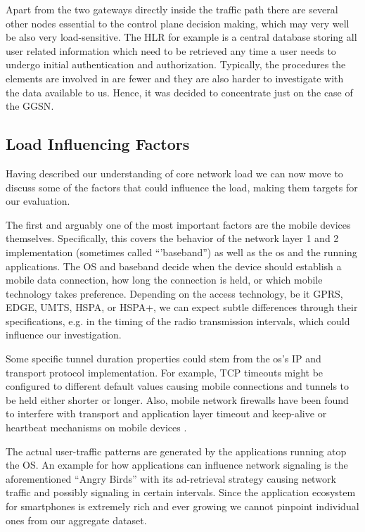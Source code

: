 Apart from the two gateways directly inside the traffic path there are several other nodes essential to the control plane decision making, which may very well be also very load-sensitive. The \gls{HLR} for example is a central database storing all user related information which need to be retrieved any time a user needs to undergo initial authentication and authorization. Typically, the procedures the elements are involved in are fewer and they are also harder to investigate with the data available to us. Hence, it was decided to concentrate just on the case of the \gls{GGSN}.


\subsection{Load Influencing Factors}

Having described our understanding of core network load we can now move to discuss some of the factors that could influence the load, making them targets for our evaluation.

The first and arguably one of the most important factors are the mobile devices themselves. Specifically, this covers the behavior of the network layer 1 and 2 implementation (sometimes called ``'baseband'') as well as the \gls{os} and the running applications. The OS and baseband decide when the device should establish a mobile data connection, how long the connection is held, or which mobile technology takes preference. Depending on the access technology, be it \acrshort{GPRS}, \acrshort{EDGE}, \acrshort{UMTS}, \acrshort{HSPA}, or \acrshort{HSPA+}, we can expect subtle differences through their specifications, e.g. in the timing of the radio transmission intervals, which could influence our investigation. 

Some specific tunnel duration properties could stem from the \gls{os}'s IP and transport protocol implementation. For example, TCP timeouts might be configured to different default values causing mobile connections and tunnels to be held either shorter or longer. Also, mobile network firewalls have been found to interfere with transport and application layer timeout and keep-alive or heartbeat mechanisms on mobile devices \cite{sigcomm11middleboxes}.

The actual user-traffic patterns are generated by the applications running atop the OS. An example for how applications can influence network signaling is the aforementioned ``Angry Birds'' with its ad-retrieval strategy causing network traffic and possibly signaling in certain intervals. Since the application ecosystem for smartphones is extremely rich and ever growing we cannot pinpoint individual ones from our aggregate dataset.

